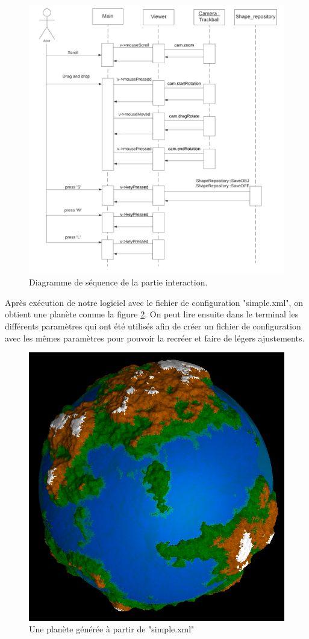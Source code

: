 \documentclass[a4paper]{article}
\begin{document}
\begin{figure}[!ht]
    \begin{center}
        \includegraphics[width=\linewidth]{img/interaction_seq.png} 
        \caption{Diagramme de séquence de la partie interaction.}
        \label{seqinter}
    \end{center}
\end{figure}
\newpage
Après exécution de notre logiciel avec le fichier de configuration "simple.xml", on obtient une planète comme la figure \ref{notre_planete}. On peut lire ensuite dans le terminal les différents paramètres qui ont été utilisés afin de créer un fichier de configuration avec les mêmes paramètres pour pouvoir la recréer et faire de légers ajustements.\\

\begin{figure}[!ht]
    \begin{center}
        \includegraphics[width=0.6\linewidth]{img/notre_planete.png} 
        \caption{Une planète générée à partir de "simple.xml"}
        \label{notre_planete}
    \end{center}
\end{figure}
\end{document}
